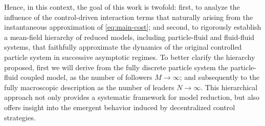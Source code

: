 \documentclass[10pt, reqno]{amsart}
\theoremstyle{definition}
\theoremstyle{remark}
\numberwithin{equation}{section}
\begin{document}
 Hence, in this context, the goal of this work is twofold: first, to analyze the influence of the control-driven interaction terms that naturally arising from the instantaneous approximation of \eqref{eq:main-cost}; and second, to rigorously establish a mean-field hierarchy of reduced models, including particle-fluid and fluid-fluid systems, that faithfully approximate the dynamics of the original controlled particle system in successive asymptotic regimes.
 To better clarify the hierarchy proposed, first we will derive from the fully discrete particle system the particle-fluid coupled model, as the number of followers $M \to \infty$; and subsequently to the fully macroscopic description as the number of leaders $N \to \infty$. 
 This hierarchical approach not only provides a systematic framework for model reduction, but also offers insight into the emergent behavior induced by decentralized control strategies.  
 
\end{document}
